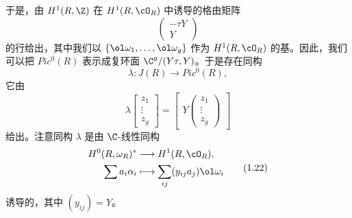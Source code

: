 于是，由 $H^1(R,\Z)$ 在 $H^1(R,\cO_R)$ 中诱导的格由矩阵
\[
  \begin{pmatrix} -\tau Y\\ Y\end{pmatrix}
\]
的行给出，其中我们以 $\{\ol\omega_1,\dots,\ol\omega_g\}$ 作为 $H^1(R,\cO_R)$ 的基。因此，我们可以把 $Pic^0(R)$ 表示成复环面 $\C^g/(Y\tau,Y)$。于是存在同构
\[
  \lambda:J(R)\longrightarrow Pic^0(R),
\]
它由
\begin{equation}
  \lambda\begin{bmatrix} z_1\\ \vdots\\ z_g\end{bmatrix}
  =\begin{bmatrix} Y\begin{pmatrix} z_1\\ \vdots\\ z_g\end{pmatrix}\end{bmatrix} \tag{1.21}
\end{equation}
给出。注意同构 $\lambda$ 是由 $\C$-线性同构
\begin{equation}
\begin{aligned}
  H^0(R,\omega_R)^* &\longrightarrow H^1(R,\cO_R),\\
  \sum a_i\alpha_i &\longmapsto \sum_{ij}(y_{ij}a_j)\ol\omega_i
\end{aligned} \tag{1.22}
\end{equation}
诱导的，其中 $(y_{ij})=Y$。

